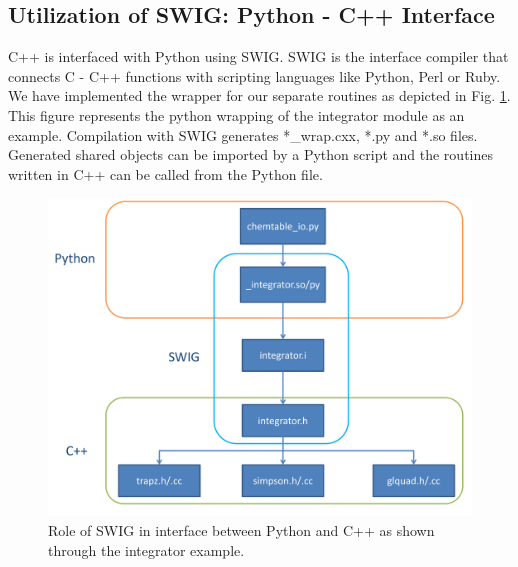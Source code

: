 \documentclass[11pt]{article}
\begin{document}
\subsection{Utilization of SWIG: Python - C++ Interface}
C++ is interfaced with Python using SWIG. SWIG is the interface compiler that connects C - C++ functions with scripting languages like Python, Perl or Ruby. We have implemented the wrapper for our separate routines as depicted in Fig.  \ref{fig:swig}. This figure represents the python wrapping of the integrator module as an example. Compilation with SWIG generates *\_wrap.cxx, *.py and *.so files. Generated shared objects can be imported by a Python script and the routines written in C++ can be called from the Python file.

\begin{figure} [h]
\centering
\includegraphics[width=\textwidth]{python_swig_c++}
\caption{\label{fig:swig} Role of SWIG in interface between Python and C++ as shown through the integrator example.}
\end{figure}
\end{document}
